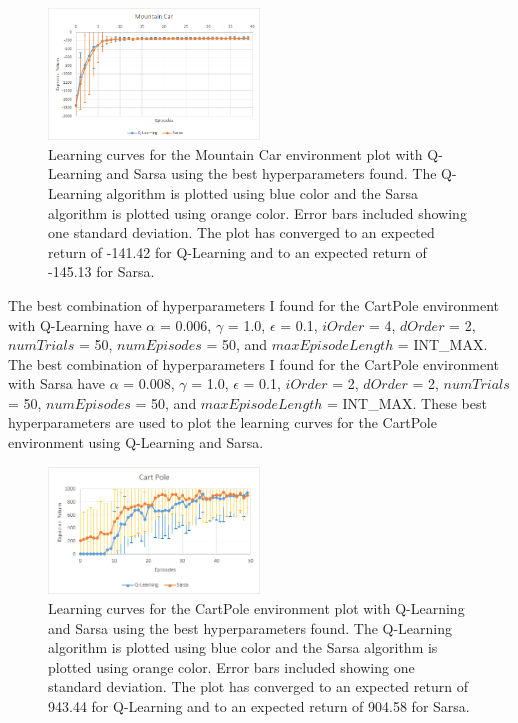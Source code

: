 \documentclass[]{article}
\begin{document}
\begin{enumerate}
{		\begin{figure}[H]
		    \centering
		    \includegraphics[width=0.5\textwidth]{MountainCar.png}
		    \caption{Learning curves for the Mountain Car environment plot with Q-Learning and Sarsa using the best hyperparameters found. The Q-Learning algorithm is plotted using blue color and the Sarsa algorithm is plotted using orange color. Error bars included showing one standard deviation. The plot has converged to an expected return of -141.42 for Q-Learning and to an expected return of -145.13 for Sarsa.}
		    \label{fig: Mountain Car environment plot with Q-Learning and Sarsa}
		\end{figure}

The best combination of hyperparameters I found for the CartPole environment with Q-Learning have $\alpha$ = 0.006, $\gamma$ = 1.0, $\epsilon$ = 0.1, $iOrder$ = 4, $dOrder$ =  2, $numTrials$ = 50, $numEpisodes$ = 50, and $maxEpisodeLength$ = INT\_MAX.
The best combination of hyperparameters I found for the CartPole environment with Sarsa have $\alpha$ = 0.008, $\gamma$ = 1.0, $\epsilon$ = 0.1, $iOrder$ = 2, $dOrder$ =  2, $numTrials$ = 50, $numEpisodes$ = 50, and $maxEpisodeLength$ = INT\_MAX.
These best hyperparameters are used to plot the learning curves for the CartPole environment using Q-Learning and Sarsa.
		
		\begin{figure}[H]
		    \centering
		    \includegraphics[width=0.5\textwidth]{Cartpole.png}
		    \caption{Learning curves for the CartPole environment plot with Q-Learning and Sarsa using the best hyperparameters found. The Q-Learning algorithm is plotted using blue color and the Sarsa algorithm is plotted using orange color. Error bars included showing one standard deviation. The plot has converged to an expected return of 943.44 for Q-Learning and to an expected return of 904.58 for Sarsa.}
		    \label{fig: Cross Entropy Method algorithm for More-Watery 687-Gridworld}
		\end{figure}

}
\end{enumerate}
\end{document}
